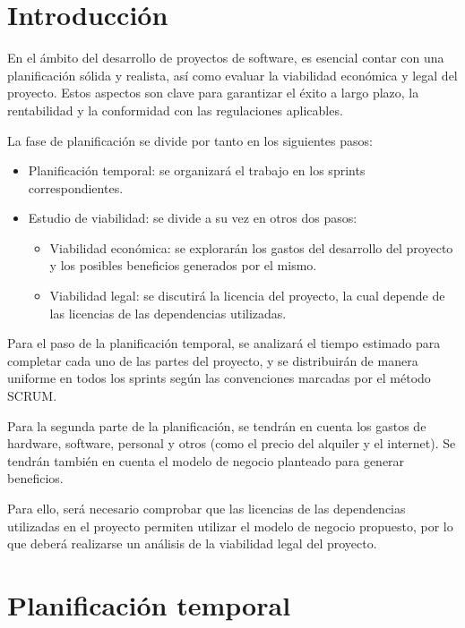 
\section{Introducción}

En el ámbito del desarrollo de proyectos de software, es esencial contar con una planificación
sólida y realista, así como evaluar la viabilidad económica y legal del proyecto. Estos aspectos 
son clave para garantizar el éxito a largo plazo, la rentabilidad y la conformidad con las 
regulaciones aplicables.

La fase de planificación se divide por tanto en los siguientes pasos:
\begin{itemize}
    \item Planificación temporal: se organizará el trabajo en los sprints correspondientes.
    \item Estudio de viabilidad: se divide a su vez en otros dos pasos:
    \begin{itemize}
        \item Viabilidad económica: se explorarán los gastos del desarrollo del proyecto 
            y los posibles beneficios generados por el mismo.
        \item Viabilidad legal: se discutirá la licencia del proyecto, la cual depende de las
            licencias de las dependencias utilizadas.
    \end{itemize}
\end{itemize}

Para el paso de la planificación temporal, se analizará el tiempo estimado para completar cada 
uno de las partes del proyecto, y se distribuirán de manera uniforme en todos los sprints según 
las convenciones marcadas por el método SCRUM.

Para la segunda parte de la planificación, se tendrán en cuenta los gastos de hardware, software, 
personal y otros (como el precio del alquiler y el internet). Se tendrán también en cuenta el modelo de 
negocio planteado para generar beneficios.

Para ello, será necesario comprobar que las licencias de las dependencias utilizadas en el proyecto 
permiten utilizar el modelo de negocio propuesto, por lo que deberá realizarse un análisis de la 
viabilidad legal del proyecto.

\section{Planificación temporal}

